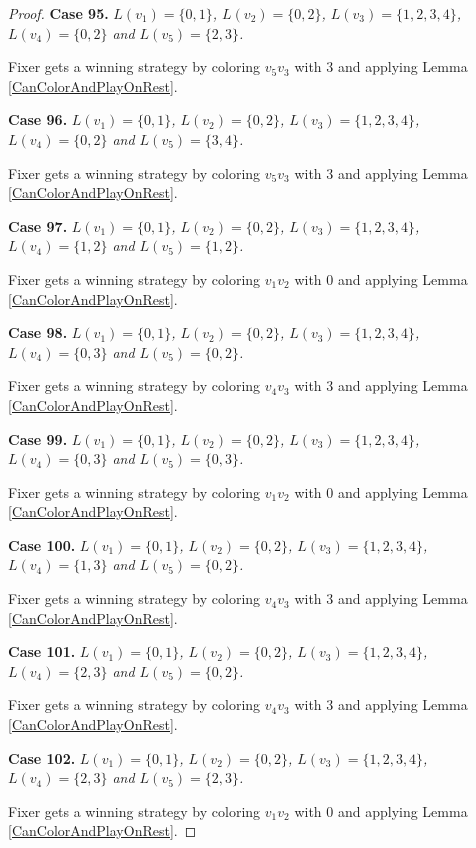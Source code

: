 \documentclass[12pt]{amsart}
\theoremstyle{plain}
\theoremstyle{definition}
\theoremstyle{remark}
\begin{document}
\begin{proof}
\noindent\textbf{Case 95.  }\textit{$L(v_1) = \{0, 1\}$, $L(v_2) = \{0, 2\}$, $L(v_3) = \{1, 2, 3, 4\}$, $L(v_4) = \{0, 2\}$ and $L(v_5) = \{2, 3\}$.}

Fixer gets a winning strategy by coloring $v_5v_3$ with $3$ and applying Lemma \ref{CanColorAndPlayOnRest}.

\noindent\textbf{Case 96.  }\textit{$L(v_1) = \{0, 1\}$, $L(v_2) = \{0, 2\}$, $L(v_3) = \{1, 2, 3, 4\}$, $L(v_4) = \{0, 2\}$ and $L(v_5) = \{3, 4\}$.}

Fixer gets a winning strategy by coloring $v_5v_3$ with $3$ and applying Lemma \ref{CanColorAndPlayOnRest}.

\noindent\textbf{Case 97.  }\textit{$L(v_1) = \{0, 1\}$, $L(v_2) = \{0, 2\}$, $L(v_3) = \{1, 2, 3, 4\}$, $L(v_4) = \{1, 2\}$ and $L(v_5) = \{1, 2\}$.}

Fixer gets a winning strategy by coloring $v_1v_2$ with $0$ and applying Lemma \ref{CanColorAndPlayOnRest}.

\noindent\textbf{Case 98.  }\textit{$L(v_1) = \{0, 1\}$, $L(v_2) = \{0, 2\}$, $L(v_3) = \{1, 2, 3, 4\}$, $L(v_4) = \{0, 3\}$ and $L(v_5) = \{0, 2\}$.}

Fixer gets a winning strategy by coloring $v_4v_3$ with $3$ and applying Lemma \ref{CanColorAndPlayOnRest}.

\noindent\textbf{Case 99.  }\textit{$L(v_1) = \{0, 1\}$, $L(v_2) = \{0, 2\}$, $L(v_3) = \{1, 2, 3, 4\}$, $L(v_4) = \{0, 3\}$ and $L(v_5) = \{0, 3\}$.}

Fixer gets a winning strategy by coloring $v_1v_2$ with $0$ and applying Lemma \ref{CanColorAndPlayOnRest}.

\noindent\textbf{Case 100.  }\textit{$L(v_1) = \{0, 1\}$, $L(v_2) = \{0, 2\}$, $L(v_3) = \{1, 2, 3, 4\}$, $L(v_4) = \{1, 3\}$ and $L(v_5) = \{0, 2\}$.}

Fixer gets a winning strategy by coloring $v_4v_3$ with $3$ and applying Lemma \ref{CanColorAndPlayOnRest}.

\noindent\textbf{Case 101.  }\textit{$L(v_1) = \{0, 1\}$, $L(v_2) = \{0, 2\}$, $L(v_3) = \{1, 2, 3, 4\}$, $L(v_4) = \{2, 3\}$ and $L(v_5) = \{0, 2\}$.}

Fixer gets a winning strategy by coloring $v_4v_3$ with $3$ and applying Lemma \ref{CanColorAndPlayOnRest}.

\noindent\textbf{Case 102.  }\textit{$L(v_1) = \{0, 1\}$, $L(v_2) = \{0, 2\}$, $L(v_3) = \{1, 2, 3, 4\}$, $L(v_4) = \{2, 3\}$ and $L(v_5) = \{2, 3\}$.}

Fixer gets a winning strategy by coloring $v_1v_2$ with $0$ and applying Lemma \ref{CanColorAndPlayOnRest}.


\end{proof}
\end{document}
